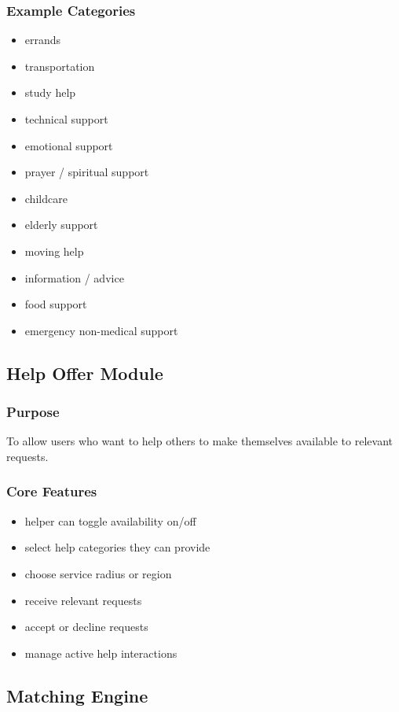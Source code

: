 \documentclass[11pt]{article}
\begin{document}
\subsubsection{Example Categories}
\begin{itemize}[leftmargin=1.5em]
    \item errands
    \item transportation
    \item study help
    \item technical support
    \item emotional support
    \item prayer / spiritual support
    \item childcare
    \item elderly support
    \item moving help
    \item information / advice
    \item food support
    \item emergency non-medical support
\end{itemize}

\subsection{Help Offer Module}

\subsubsection{Purpose}
To allow users who want to help others to make themselves available to relevant requests.

\subsubsection{Core Features}
\begin{itemize}[leftmargin=1.5em]
    \item helper can toggle availability on/off
    \item select help categories they can provide
    \item choose service radius or region
    \item receive relevant requests
    \item accept or decline requests
    \item manage active help interactions
\end{itemize}

\subsection{Matching Engine}
\end{document}
